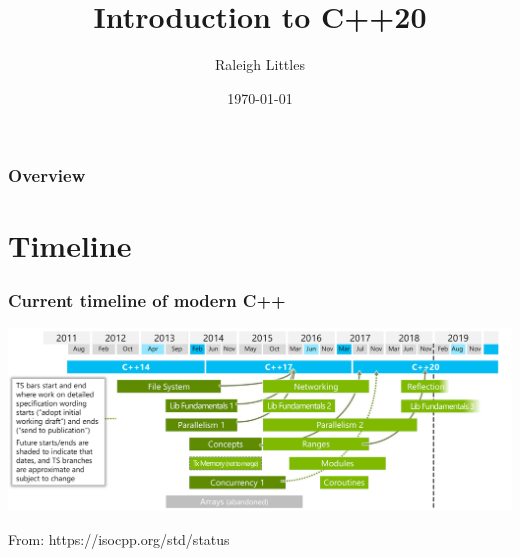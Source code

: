 \documentclass{beamer}
\title[Intro to C++20]{Introduction to C++20} %
\author{Raleigh Littles} %
\institute[Karl Storz Imaging] %
{
 \\ %
\medskip
\textit{} %
}
\date{\today} %
\begin{document}
\begin{frame}
\titlepage %
\end{frame}

\begin{frame}
\frametitle{Overview} %
\tableofcontents %
\end{frame}


\section{Timeline} %


\begin{frame}
\frametitle{Current timeline of modern C++}

\includegraphics[width=\textwidth,height=\textheight,keepaspectratio]{timeline}

\vspace{1em}

From: https://isocpp.org/std/status

\end{frame}
\end{document}
